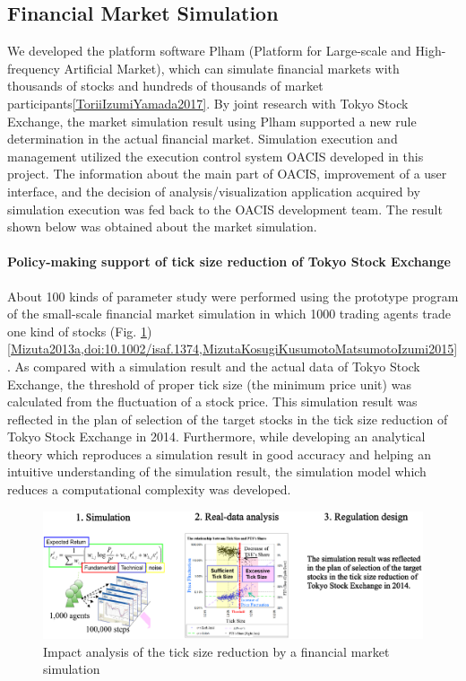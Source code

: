 \subsection{Financial Market Simulation}
\label{ss:Market Simulation}

We developed the platform software Plham (Platform for Large-scale and
High-frequency Artificial Market), which can simulate financial
markets with thousands of stocks and hundreds of thousands of market
participants\ref{ToriiIzumiYamada2017}.  By joint research with Tokyo
Stock Exchange, the market simulation result using Plham supported a
new rule determination in the actual financial market.  Simulation
execution and management utilized the execution control system OACIS
developed in this project.  The information about the main part of
OACIS, improvement of a user interface, and the decision of
analysis/visualization application acquired by simulation execution
was fed back to the OACIS development team.  The result shown below
was obtained about the market simulation.

\paragraph{Policy-making support of tick size reduction of Tokyo Stock Exchange}

About 100 kinds of parameter study were performed using the prototype
program of the small-scale financial market simulation in which 1000
trading agents trade one kind of stocks
(Fig. \ref{fig:Figs.izumi/ticksize.eps})\ref{Mizuta2013a,doi:10.1002/isaf.1374,MizutaKosugiKusumotoMatsumotoIzumi2015}.
As compared with a simulation result and the actual data of Tokyo
Stock Exchange, the threshold of proper tick size (the minimum price
unit) was calculated from the fluctuation of a stock price.  This
simulation result was reflected in the plan of selection of the target
stocks in the tick size reduction of Tokyo Stock Exchange in 2014.
Furthermore, while developing an analytical theory which reproduces a
simulation result in good accuracy and helping an intuitive
understanding of the simulation result, the simulation model which
reduces a computational complexity was developed.

\begin{figure}[htb]
  \centering
  \includegraphics[width=.8\linewidth]{Figs.izumi/TickSize.eps}
  \caption{Impact analysis of the tick size reduction by a financial market simulation}
  \label{fig:Figs.izumi/ticksize.eps}
\end{figure}

